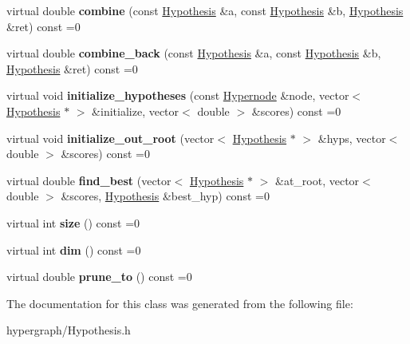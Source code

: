 \begin{DoxyCompactItemize}
\item 
\hypertarget{classController_a0d228cf815695f824519acdf32a7eb12}{
virtual double {\bfseries combine} (const \hyperlink{structHypothesis}{Hypothesis} \&a, const \hyperlink{structHypothesis}{Hypothesis} \&b, \hyperlink{structHypothesis}{Hypothesis} \&ret) const =0}
\label{classController_a0d228cf815695f824519acdf32a7eb12}

\item 
\hypertarget{classController_a03e469bfe917933eb3263b2150225324}{
virtual double {\bfseries combine\_\-back} (const \hyperlink{structHypothesis}{Hypothesis} \&a, const \hyperlink{structHypothesis}{Hypothesis} \&b, \hyperlink{structHypothesis}{Hypothesis} \&ret) const =0}
\label{classController_a03e469bfe917933eb3263b2150225324}

\item 
\hypertarget{classController_a53fd929ea0f9b91b8cd0d8aea2b521ac}{
virtual void {\bfseries initialize\_\-hypotheses} (const \hyperlink{classScarab_1_1Hypernode}{Hypernode} \&node, vector$<$ \hyperlink{structHypothesis}{Hypothesis} $\ast$ $>$ \&initialize, vector$<$ double $>$ \&scores) const =0}
\label{classController_a53fd929ea0f9b91b8cd0d8aea2b521ac}

\item 
\hypertarget{classController_a1f3cef33f56fc3b6f540d33b1c1435da}{
virtual void {\bfseries initialize\_\-out\_\-root} (vector$<$ \hyperlink{structHypothesis}{Hypothesis} $\ast$ $>$ \&hyps, vector$<$ double $>$ \&scores) const =0}
\label{classController_a1f3cef33f56fc3b6f540d33b1c1435da}

\item 
\hypertarget{classController_a483f3bade0a59f6bd5fd0e2f70c36290}{
virtual double {\bfseries find\_\-best} (vector$<$ \hyperlink{structHypothesis}{Hypothesis} $\ast$ $>$ \&at\_\-root, vector$<$ double $>$ \&scores, \hyperlink{structHypothesis}{Hypothesis} \&best\_\-hyp) const =0}
\label{classController_a483f3bade0a59f6bd5fd0e2f70c36290}

\item 
\hypertarget{classController_a22e83275322aa3a07354e5a89f6e94b6}{
virtual int {\bfseries size} () const =0}
\label{classController_a22e83275322aa3a07354e5a89f6e94b6}

\item 
\hypertarget{classController_a3e9b3ee2fa55d3754f8b239f6d9ba070}{
virtual int {\bfseries dim} () const =0}
\label{classController_a3e9b3ee2fa55d3754f8b239f6d9ba070}

\item 
\hypertarget{classController_a2885bc9c93be678b03e5c8f5ee06da0c}{
virtual double {\bfseries prune\_\-to} () const =0}
\label{classController_a2885bc9c93be678b03e5c8f5ee06da0c}

\end{DoxyCompactItemize}


The documentation for this class was generated from the following file:\begin{DoxyCompactItemize}
\item 
hypergraph/Hypothesis.h\end{DoxyCompactItemize}
